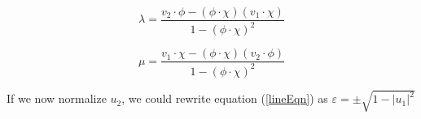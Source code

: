 \documentclass{article}
\begin{document}
\begin{equation}
    \lambda =
    \frac{v_2\cdot\phi-(\phi\cdot\chi)(v_1\cdot\chi)}{1-(\phi\cdot\chi)^2}
\end{equation}

\begin{equation}
    \mu =
    \frac{v_1\cdot\chi-(\phi\cdot\chi)(v_2\cdot\phi)}{1-(\phi\cdot\chi)^2}
\end{equation}

If we now normalize $u_2$, we could rewrite equation (\ref{lineEqn}) as
$\varepsilon=\pm\sqrt{1-|u_1|^2}$
\end{document}
